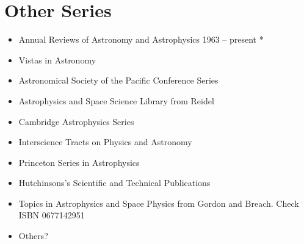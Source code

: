 \section{Other Series}

\begin{itemize}
  \item Annual Reviews of Astronomy and Astrophysics 1963 -- present *
  \item Vistas in Astronomy
  \item Astronomical Society of the Pacific Conference Series
  \item Astrophysics and Space Science Library from Reidel
  \item Cambridge Astrophysics Series
  \item Interscience Tracts on Physics and Astronomy
  \item Princeton Series in Astrophysics
  \item Hutchinsons's Scientific and Technical Publications
  \item Topics in Astrophysics and Space Physics from Gordon and Breach. Check ISBN 0677142951
  \item Others?
\end{itemize}
